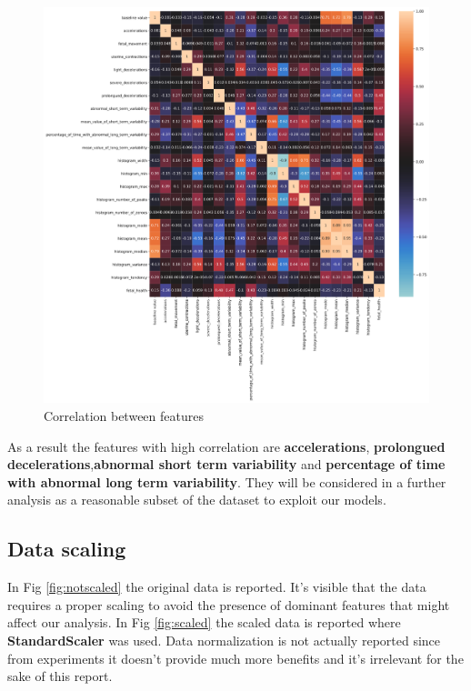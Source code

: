 \documentclass[a4paper,12pt]{article}
\begin{document}
\begin{figure}[H]
  \begin{center}
  \includegraphics[width=1.0\textwidth]{images/correlation.png}
  \end{center}
  \caption{Correlation between features}
  \label{fig:correlation}
\end{figure}

\noindent As a result the features with high correlation are \textbf{accelerations}, \textbf{prolongued decelerations},\textbf{abnormal short term variability} and \textbf{percentage of time with abnormal long term variability}. They will be considered in a further analysis as a reasonable subset of the dataset to exploit our models.

\subsection{Data scaling}
In Fig \ref{fig:notscaled} the original data is reported. It's visible that the data requires a proper scaling to avoid the presence of dominant features that might affect our analysis. In Fig \ref{fig:scaled} the scaled data is reported where \textbf{StandardScaler} was used. Data normalization is not actually reported since from experiments it doesn't provide much more benefits and it's irrelevant for the sake of this report.
\end{document}
